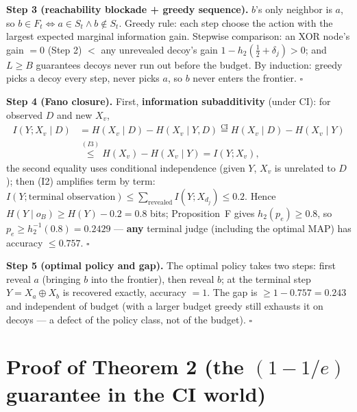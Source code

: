 \documentclass{article}
\providecommand{\qed}{\hfill$\square$}
\begin{document}
\textbf{Step 3 (reachability blockade + greedy sequence).} $b$'s only neighbor is $a$, so $b\in F_t\iff a\in S_t\wedge b\notin S_t$. Greedy rule: each step choose the action with the largest expected marginal information gain. Stepwise comparison: an XOR node's gain $=0$ (Step 2) $<$ any unrevealed decoy's gain $1-h_2(\tfrac12+\delta_j)>0$; and $L\ge B$ guarantees decoys never run out before the budget. By induction: greedy picks a decoy every step, never picks $a$, so $b$ never enters the frontier. \qed{}

\textbf{Step 4 (Fano closure).} First, \textbf{information subadditivity} (under CI): for observed $D$ and new $X_v$,
\[
\begin{aligned}
I(Y;X_v\mid D)&=H(X_v\mid D)-H(X_v\mid Y,D)\overset{\text{CI}}{=}H(X_v\mid D)-H(X_v\mid Y)\\
&\overset{(I3)}{\le}H(X_v)-H(X_v\mid Y)=I(Y;X_v),
\end{aligned}
\]
the second equality uses conditional independence (given $Y$, $X_v$ is unrelated to $D$); then (I2) amplifies term by term: $I(Y;\text{terminal observation})\le\sum_{\text{revealed}}I(Y;X_{d_j})\le0.2$. Hence $H(Y\mid o_B)\ge H(Y)-0.2=0.8$ bits; Proposition~F gives $h_2(p_e)\ge0.8$, so $p_e\ge h_2^{-1}(0.8)=0.2429$ --- \textbf{any} terminal judge (including the optimal MAP) has accuracy $\le0.757$. \qed{}

\textbf{Step 5 (optimal policy and gap).} The optimal policy takes two steps: first reveal $a$ (bringing $b$ into the frontier), then reveal $b$; at the terminal step $Y=X_a\oplus X_b$ is recovered exactly, accuracy $=1$. The gap is $\ge1-0.757=0.243$ and independent of budget (with a larger budget greedy still exhausts it on decoys --- a defect of the policy class, not of the budget). \qed{}

\section{Proof of Theorem 2 (the $(1-1/e)$ guarantee in the CI world)}
\label{app:thm2}
\end{document}
